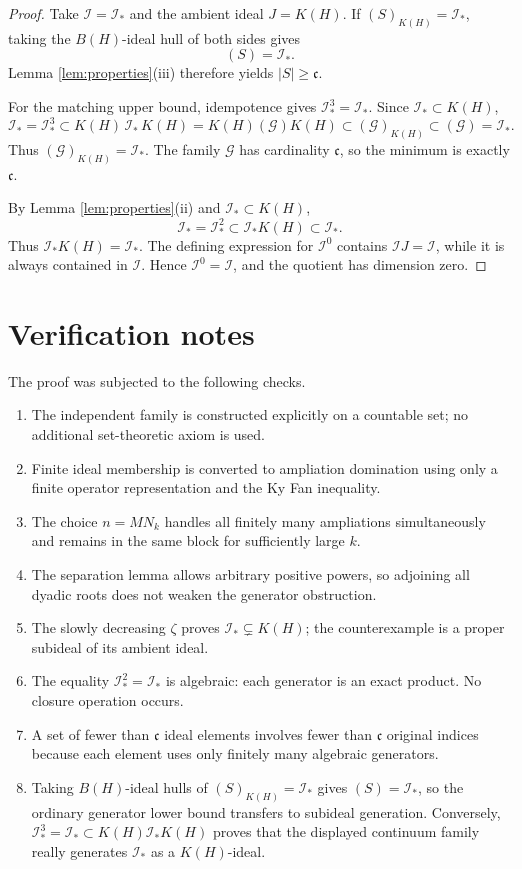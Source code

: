 \documentclass[11pt]{article}
\newcommand{\BH}{B(H)}
\newcommand{\KH}{K(H)}
\newcommand{\cc}{\mathfrak c}
\newcommand{\Istar}{\mathcal I_{\!*}}
\begin{document}
\begin{proof}
Take \(\mathcal I=\Istar\) and the ambient ideal \(J=\KH\).  If
\((S)_{\KH}=\Istar\), taking the \(\BH\)-ideal hull of both sides gives
\[
                         (S)=\Istar.
\]
Lemma \ref{lem:properties}(iii) therefore yields \(|S|\geq\cc\).

For the matching upper bound, idempotence gives
\(\Istar^3=\Istar\).  Since \(\Istar\subset\KH\),
\[
 \Istar=\Istar^3
 \subset\KH\,\Istar\,\KH
 =\KH(\mathcal G)\KH
 \subset(\mathcal G)_{\KH}
 \subset(\mathcal G)=\Istar.
\]
Thus \((\mathcal G)_{\KH}=\Istar\).  The family \(\mathcal G\) has
cardinality \(\cc\), so the minimum is exactly \(\cc\).

By Lemma \ref{lem:properties}(ii) and \(\Istar\subset\KH\),
\[
       \Istar=\Istar^2\subset\Istar\KH\subset\Istar.
\]
Thus \(\Istar\KH=\Istar\).  The defining expression for
\(\mathcal I^0\) contains \(\mathcal I J=\mathcal I\), while it is always
contained in \(\mathcal I\).  Hence
\(\mathcal I^0=\mathcal I\), and the quotient has dimension zero.
\end{proof}

\section{Verification notes}

The proof was subjected to the following checks.

\begin{enumerate}
 \item The independent family is constructed explicitly on a countable set;
       no additional set-theoretic axiom is used.
 \item Finite ideal membership is converted to ampliation domination using
       only a finite operator representation and the Ky Fan inequality.
 \item The choice \(n=MN_k\) handles all finitely many ampliations
       simultaneously and remains in the same block for sufficiently large
       \(k\).
 \item The separation lemma allows arbitrary positive powers, so adjoining
       all dyadic roots does not weaken the generator obstruction.
 \item The slowly decreasing \(\zeta\) proves
       \(\Istar\subsetneq\KH\); the counterexample is a proper subideal of
       its ambient ideal.
 \item The equality \(\Istar^2=\Istar\) is algebraic: each generator is an
       exact product.  No closure operation occurs.
 \item A set of fewer than \(\cc\) ideal elements involves fewer than
       \(\cc\) original indices because each element uses only finitely many
       algebraic generators.
 \item Taking \(\BH\)-ideal hulls of
       \((S)_{\KH}=\Istar\) gives \((S)=\Istar\), so the ordinary generator
       lower bound transfers to subideal generation.  Conversely,
       \(\Istar^3=\Istar\subset\KH\Istar\KH\) proves that the displayed
       continuum family really generates \(\Istar\) as a \(K(H)\)-ideal.
\end{enumerate}
\end{document}
